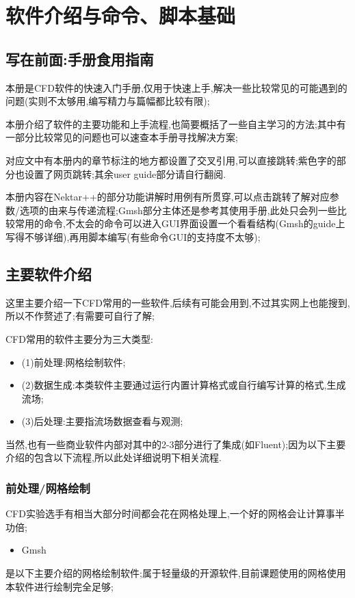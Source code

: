 \chapter{软件介绍与命令、脚本基础}
\setcounter{page}{1}


\section{写在前面:手册食用指南}

本册是CFD软件的快速入门手册,仅用于快速上手,解决一些比较常见的可能遇到的问题(实则不太够用,编写精力与篇幅都比较有限);\par
本册介绍了软件的主要功能和上手流程,也简要概括了一些自主学习的方法;其中有一部分比较常见的问题也可以速查本手册寻找解决方案;\par
对应文中有本册内的章节标注的地方都设置了交叉引用,可以直接跳转;紫色字的部分也设置了网页跳转;其余user guide部分请自行翻阅.\par
本册内容在Nektar++的部分功能讲解时用例有所贯穿,可以点击跳转了解对应参数/选项的由来与传递流程;Gmsh部分主体还是参考其使用手册,此处只会列一些比较常用的命令,不太会的命令可以进入GUI界面设置一个看看结构(Gmsh的guide上写得不够详细),再用脚本编写(有些命令GUI的支持度不太够);


\section{主要软件介绍}

这里主要介绍一下CFD常用的一些软件,后续有可能会用到,不过其实网上也能搜到,所以不作赘述了;有需要可自行了解; \par
CFD常用的软件主要分为三大类型:\par
\begin{itemize}
	\item{(1)前处理:网格绘制软件;}
\end{itemize}
\begin{itemize}
	\item{(2)数据生成:本类软件主要通过运行内置计算格式或自行编写计算的格式,生成流场;}
\end{itemize}
\begin{itemize}
	\item{(3)后处理:主要指流场数据查看与观测;}
\end{itemize}
\par
当然,也有一些商业软件内部对其中的2-3部分进行了集成(如Fluent);因为以下主要介绍的包含以下流程,所以此处详细说明下相关流程.

\subsection{前处理/网格绘制}
CFD实验选手有相当大部分时间都会花在网格处理上,一个好的网格会让计算事半功倍;
\begin{itemize}
	\item{Gmsh}
\end{itemize}
	\par 是以下主要介绍的网格绘制软件;属于轻量级的开源软件,目前课题使用的网格使用本软件进行绘制完全足够;
	
